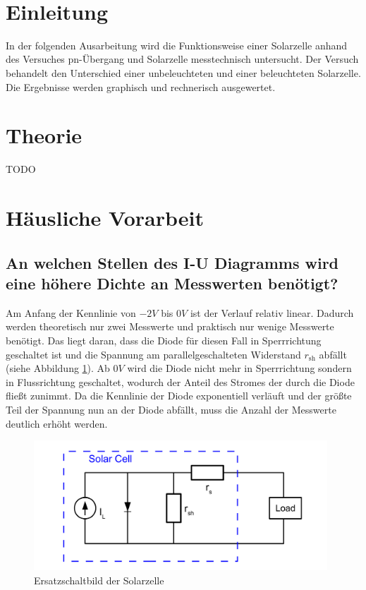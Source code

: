 \documentclass[a4paper]{scrartcl}
\def\header#1#2{
  \begin{center}
    {\Large #1}\\
    {#2}
  \end{center}
}
\numberwithin{equation}{subsection}
\begin{document}
\vspace{10pt}
\header{\HEADDING}{\SUBHEADDING}

\tableofcontents

\newpage

\section{Einleitung}
In der folgenden Ausarbeitung wird die Funktionsweise einer Solarzelle anhand des Versuches
\glqq pn-Übergang und Solarzelle\grqq \hspace{0cm} messtechnisch untersucht. Der Versuch behandelt
den Unterschied einer unbeleuchteten und einer beleuchteten Solarzelle. Die Ergebnisse werden graphisch
und rechnerisch ausgewertet.
\newpage
\section{Theorie}
TODO

\newpage
\section{Häusliche Vorarbeit}
\subsection{An welchen Stellen des I-U Diagramms wird eine höhere Dichte an Messwerten benötigt?}
Am Anfang der Kennlinie von $-2V$ bis $0V$ ist der Verlauf relativ linear. Dadurch werden theoretisch nur
zwei Messwerte und praktisch nur wenige Messwerte benötigt. Das liegt daran, dass die Diode für diesen
Fall in Sperrrichtung geschaltet ist und die Spannung am parallelgeschalteten Widerstand $r_{\text{sh}}$
abfällt (siehe Abbildung \ref{fig:ESB_Solar}). Ab $0V$ wird die Diode nicht mehr in Sperrrichtung sondern
in Flussrichtung geschaltet, wodurch der Anteil des Stromes der durch die Diode fließt zunimmt.
Da die Kennlinie der Diode exponentiell verläuft und der größte Teil der Spannung nun an der Diode
abfällt, muss die Anzahl der Messwerte deutlich erhöht werden.

\begin{figure}[H]
\includegraphics[width=11cm]{ESB_Solarzelle}
\centering
\caption{Ersatzschaltbild der Solarzelle}
\centering
\label{fig:ESB_Solar}
\end{figure}
\end{document}
